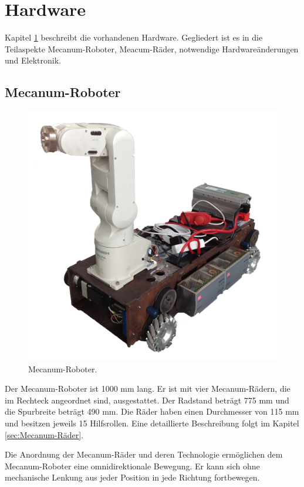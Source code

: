 
\section{Hardware}
\label{sec:Hardware}

Kapitel \ref{sec:Hardware} beschreibt die vorhandenen Hardware. Gegliedert ist es in die Teilaspekte Mecanum-Roboter, Meacum-Räder, notwendige Hardwareänderungen und Elektronik.
\subsection{Mecanum-Roboter}
\label{sec:Mecanum-Roboter}

\begin{figure}[H]
\centering
 \includegraphics[width=.6\textwidth]{Abbildungen/Roboter} 
\caption[Mecanum-Roboter]{Mecanum-Roboter.}
\label{fig:Roboter}
\end{figure}


Der Mecanum-Roboter ist 1000 mm lang. Er ist mit vier Mecanum-Rädern, die im Rechteck angeordnet sind, ausgestattet. Der Radstand beträgt 775 mm und die Spurbreite beträgt 490 mm. Die Räder haben einen Durchmesser von 115 mm und besitzen jeweils 15 Hilfsrollen. Eine detaillierte Beschreibung folgt im Kapitel \ref{sec:Mecanum-Räder}.

Die Anordnung der Mecanum-Räder und deren Technologie ermöglichen dem Mecanum-Roboter eine omnidirektionale Bewegung. Er kann sich ohne mechanische Lenkung aus jeder Position in jede Richtung fortbewegen.

